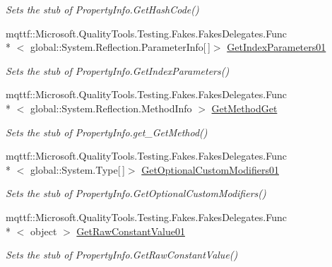 \begin{DoxyCompactItemize}
\begin{DoxyCompactList}\small\item\em Sets the stub of Property\-Info.\-Get\-Hash\-Code()\end{DoxyCompactList}\item 
mqttf\-::\-Microsoft.\-Quality\-Tools.\-Testing.\-Fakes.\-Fakes\-Delegates.\-Func\\*
$<$ global\-::\-System.\-Reflection.\-Parameter\-Info\mbox{[}$\,$\mbox{]}$>$ \hyperlink{class_system_1_1_reflection_1_1_fakes_1_1_stub_property_info_a7ff8edd5c71d919c3ee40f8efabee1f4}{Get\-Index\-Parameters01}
\begin{DoxyCompactList}\small\item\em Sets the stub of Property\-Info.\-Get\-Index\-Parameters()\end{DoxyCompactList}\item 
mqttf\-::\-Microsoft.\-Quality\-Tools.\-Testing.\-Fakes.\-Fakes\-Delegates.\-Func\\*
$<$ global\-::\-System.\-Reflection.\-Method\-Info $>$ \hyperlink{class_system_1_1_reflection_1_1_fakes_1_1_stub_property_info_a9fe7b98d4ed81ee88a1d353f6aa7f95b}{Get\-Method\-Get}
\begin{DoxyCompactList}\small\item\em Sets the stub of Property\-Info.\-get\-\_\-\-Get\-Method()\end{DoxyCompactList}\item 
mqttf\-::\-Microsoft.\-Quality\-Tools.\-Testing.\-Fakes.\-Fakes\-Delegates.\-Func\\*
$<$ global\-::\-System.\-Type\mbox{[}$\,$\mbox{]}$>$ \hyperlink{class_system_1_1_reflection_1_1_fakes_1_1_stub_property_info_a68f4fdf141b7d82e6205f7c902e10069}{Get\-Optional\-Custom\-Modifiers01}
\begin{DoxyCompactList}\small\item\em Sets the stub of Property\-Info.\-Get\-Optional\-Custom\-Modifiers()\end{DoxyCompactList}\item 
mqttf\-::\-Microsoft.\-Quality\-Tools.\-Testing.\-Fakes.\-Fakes\-Delegates.\-Func\\*
$<$ object $>$ \hyperlink{class_system_1_1_reflection_1_1_fakes_1_1_stub_property_info_afba6c33fe9a77258c82b2d86244ff09f}{Get\-Raw\-Constant\-Value01}
\begin{DoxyCompactList}\small\item\em Sets the stub of Property\-Info.\-Get\-Raw\-Constant\-Value()\end{DoxyCompactList}\item 

\end{DoxyCompactItemize}
